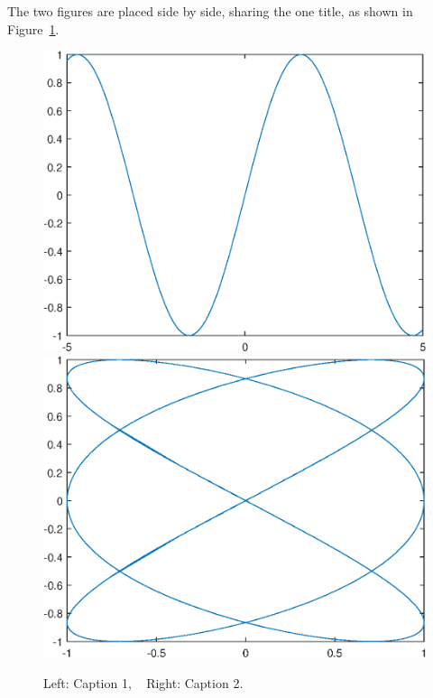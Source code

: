 \documentclass[openany,twoside,12pt]{book}
\theoremstyle{plain}
\numberwithin{equation}{chapter}
\numberwithin{figure}{chapter}
\numberwithin{table}{chapter}
\begin{document}
The two figures are placed side by side, sharing the one title, as shown in Figure~\ref{fig:twofigs}.
\begin{figure}[htp!]
  \centering
  \includegraphics[width=0.45\linewidth]{image1}
  \hfill
  \includegraphics[width=0.45\linewidth]{image2}
  \caption{Left: Caption 1, ~ Right: Caption 2.}
  \label{fig:twofigs}
\end{figure}
\end{document}
